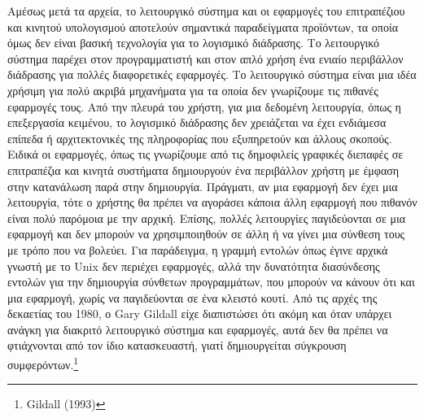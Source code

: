 \documentclass[
]{article}
\begin{document}
Αμέσως μετά τα αρχεία, το λειτουργικό σύστημα και οι εφαρμογές του
επιτραπέζιου και κινητού υπολογισμού αποτελούν σημαντικά παραδείγματα
προϊόντων, τα οποία όμως δεν είναι βασική τεχνολογία για το λογισμικό
διάδρασης. Το λειτουργικό σύστημα παρέχει στον προγραμματιστή και στον
απλό χρήση ένα ενιαίο περιβάλλον διάδρασης για πολλές διαφορετικές
εφαρμογές. Το λειτουργικό σύστημα είναι μια ιδέα χρήσιμη για πολύ ακριβά
μηχανήματα για τα οποία δεν γνωρίζουμε τις πιθανές εφαρμογές τους. Από
την πλευρά του χρήστη, για μια δεδομένη λειτουργία, όπως η επεξεργασία
κειμένου, το λογισμικό διάδρασης δεν χρειάζεται να έχει ενδιάμεσα
επίπεδα ή αρχιτεκτονικές της πληροφορίας που εξυπηρετούν και άλλους
σκοπούς. Ειδικά οι εφαρμογές, όπως τις γνωρίζουμε από τις δημοφιλείς
γραφικές διεπαφές σε επιτραπέζια και κινητά συστήματα δημιουργούν ένα
περιβάλλον χρήστη με έμφαση στην κατανάλωση παρά στην δημιουργία.
Πράγματι, αν μια εφαρμογή δεν έχει μια λειτουργία, τότε ο χρήστης θα
πρέπει να αγοράσει κάποια άλλη εφαρμογή που πιθανόν είναι πολύ παρόμοια
με την αρχική. Επίσης, πολλές λειτουργίες παγιδεύονται σε μια εφαρμογή
και δεν μπορούν να χρησιμποιηθούν σε άλλη ή να γίνει μια σύνθεση τους με
τρόπο που να βολεύει. Για παράδειγμα, η γραμμή εντολών όπως έγινε αρχικά
γνωστή με το Unix δεν περιέχει εφαρμογές, αλλά την δυνατότητα
διασύνδεσης εντολών για την δημιουργία σύνθετων προγραμμάτων, που
μπορούν να κάνουν ότι και μια εφαρμογή, χωρίς να παγιδεύονται σε ένα
κλειστό κουτί. Από τις αρχές της δεκαετίας του 1980, ο Gary Gildall είχε
διαπιστώσει ότι ακόμη και όταν υπάρχει ανάγκη για διακριτό λειτουργικό
σύστημα και εφαρμογές, αυτά δεν θα πρέπει να φτιάχνονται από τον ίδιο
κατασκευαστή, γιατί δημιουργείται σύγκρουση συμφερόντων.\footnote{Gildall
  (1993)}
\end{document}

